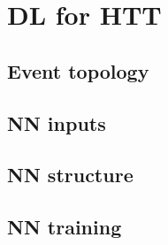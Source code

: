 \subsection*{}
\section{DL for HTT}

\subsection{Event topology}


\subsection{NN inputs}


\subsection{NN structure}


\subsection{NN training}
